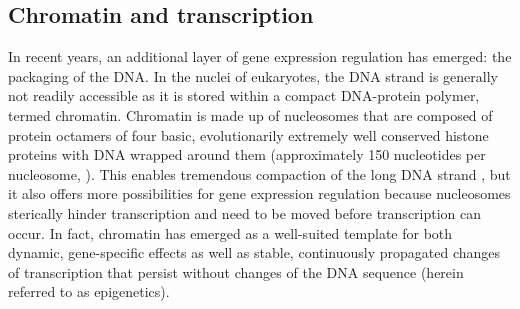 \subsection{Chromatin and transcription}
In recent years, an additional layer of gene expression regulation has emerged: the packaging of the DNA. In the nuclei of eukaryotes, the DNA strand is generally not readily accessible as it is stored within a compact DNA-protein polymer, termed chromatin. Chromatin is made up of nucleosomes that are composed of protein octamers of four basic, evolutionarily extremely well conserved histone proteins with DNA wrapped around them (approximately 150 nucleotides per nucleosome, ). This enables tremendous compaction of the long DNA strand \citep{Woodcock2010}, but it also offers more possibilities for gene expression regulation because nucleosomes sterically hinder transcription and need to be moved before transcription can occur. In fact, chromatin has emerged as a well-suited template for both dynamic, gene-specific effects as well as stable, continuously propagated changes of transcription that persist without changes of the DNA sequence (herein referred to as epigenetics).
%
